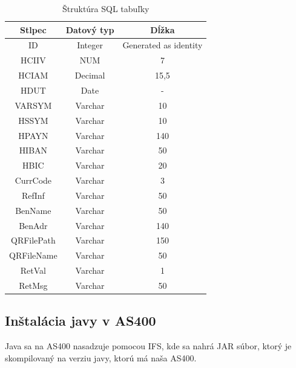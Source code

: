 \begin{table}[!ht]
\caption{Štruktúra \acs{SQL} tabuľky}
\label{tab:table_struct}
\begin{center}
    \begin{tabular}{|c|c|c|}
    \hline
    \textbf{Stlpec} & \textbf{Datový typ} & \textbf{Dĺžka}        \\ \hline
    ID              & Integer             & Generated as identity \\ \hline
    HCIIV           & NUM                 & 7                     \\ \hline
    HCIAM           & Decimal             & 15,5                  \\ \hline
    HDUT            & Date                & -                     \\ \hline
    VARSYM          & Varchar             & 10                    \\ \hline
    HSSYM           & Varchar             & 10                    \\ \hline
    HPAYN           & Varchar             & 140                   \\ \hline
    HIBAN           & Varchar             & 50                    \\ \hline
    HBIC            & Varchar             & 20                    \\ \hline
    CurrCode        & Varchar             & 3                     \\ \hline
    RefInf          & Varchar             & 50                    \\ \hline
    BenName         & Varchar             & 50                    \\ \hline
    BenAdr          & Varchar             & 140                   \\ \hline
    QRFilePath      & Varchar             & 150                   \\ \hline
    QRFileName      & Varchar             & 50                    \\ \hline
    RetVal          & Varchar             & 1                     \\ \hline
    RetMsg          & Varchar             & 50                    \\ \hline
    \end{tabular}
\end{center}    
\end{table}

\subsection{Inštalácia javy v AS400}
Java sa na AS400 nasadzuje pomocou \acs{IFS}, kde sa nahrá \acs{JAR} súbor, ktorý je skompilovaný na verziu javy, ktorú má naša AS400.

